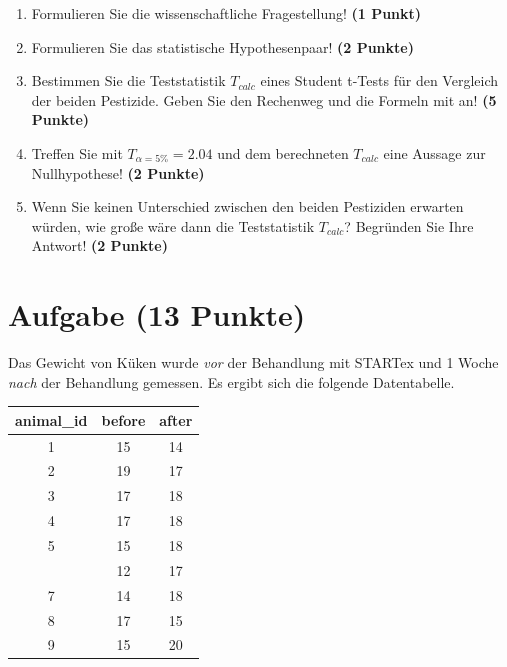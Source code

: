 \documentclass[a4paper, 10pt]{scrartcl}\usepackage[]{graphicx}\usepackage[]{xcolor}
\begin{document}
\begin{enumerate}
  \item Formulieren Sie die wissenschaftliche Fragestellung! \textbf{(1 Punkt)}
  \item Formulieren Sie das statistische Hypothesenpaar! \textbf{(2
      Punkte)}
  \item Bestimmen Sie die Teststatistik $T_{calc}$ eines Student t-Tests f{\"u}r den
  Vergleich der beiden Pestizide. Geben Sie den Rechenweg und die Formeln
  mit an! \textbf{(5 Punkte)}
\item Treffen Sie mit $T_{\alpha = 5\%} = 2.04$ und dem berechneten $T_{calc}$ eine Aussage
  zur Nullhypothese! \textbf{(2 Punkte)}
\item Wenn Sie keinen Unterschied zwischen den beiden Pestiziden erwarten
  w{\"u}rden, wie gro{\ss}e w{\"a}re dann die Teststatistik $T_{calc}$? Begr{\"u}nden Sie Ihre
  Antwort! \textbf{(2 Punkte)}
\end{enumerate} 
\clearpage

\section{Aufgabe \hfill (13 Punkte)}

Das Gewicht von K{\"u}ken wurde \textit{vor} der Behandlung mit STARTex und 1
Woche \textit{nach} der Behandlung gemessen. Es ergibt sich die folgende
Datentabelle.

\begin{table}[!h]
\centering
\begin{tabular}{ccc}
\toprule
animal\_id & before & after\\
\midrule
1 & 15 & 14\\
2 & 19 & 17\\
3 & 17 & 18\\
4 & 17 & 18\\
5 & 15 & 18\\
\addlinespace
6 & 12 & 17\\
7 & 14 & 18\\
8 & 17 & 15\\
9 & 15 & 20\\
\bottomrule
\end{tabular}
\end{table}
\end{document}
